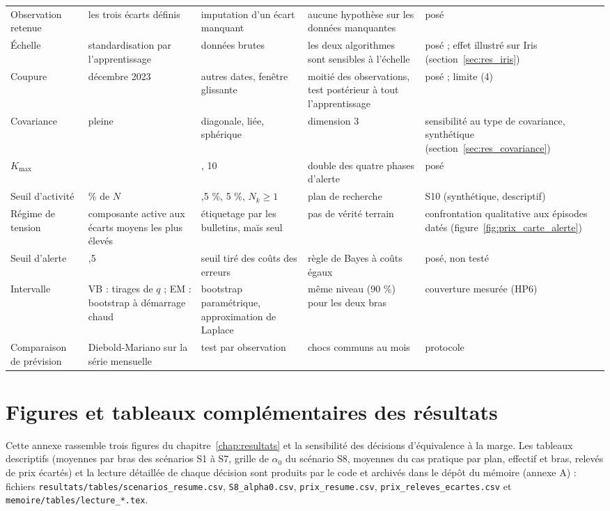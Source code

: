 {\begin{longtable}{>{\raggedright\arraybackslash}p{1.9cm}>{\raggedright\arraybackslash}p{2.9cm}>{\raggedright\arraybackslash}p{2.9cm}>{\raggedright\arraybackslash}p{3.9cm}>{\raggedright\arraybackslash}p{3.0cm}}
Observation retenue & les trois écarts définis & imputation d'un écart manquant & aucune hypothèse sur les données manquantes & posé \\
Échelle & standardisation par l'apprentissage & données brutes & les deux algorithmes sont sensibles à l'échelle & posé ; effet illustré sur Iris (section~\ref{sec:res_iris}) \\
Coupure & décembre 2023 & autres dates, fenêtre glissante & moitié des observations, test postérieur à tout l'apprentissage & posé ; limite (4) \\
Covariance & pleine & diagonale, liée, sphérique & dimension 3 & sensibilité au type de covariance, synthétique (section~\ref{sec:res_covariance}) \\
$K_{\max}$ & 8 & 6, 10 & double des quatre phases d'alerte & posé \\
Seuil d'activité & 1 \% de $N$ & 0,5 \%, 5 \%, $N_k \geq 1$ & plan de recherche & S10 (synthétique, descriptif) \\
Régime de tension & composante active aux écarts moyens les plus élevés & étiquetage par les bulletins, maïs seul & pas de vérité terrain & confrontation qualitative aux épisodes datés (figure~\ref{fig:prix_carte_alerte}) \\
Seuil d'alerte & 0,5 & seuil tiré des coûts des erreurs & règle de Bayes à coûts égaux & posé, non testé \\
Intervalle & VB : tirages de $q$ ; EM : bootstrap à démarrage chaud & bootstrap paramétrique, approximation de Laplace & même niveau (90 \%) pour les deux bras & couverture mesurée (HP6) \\
Comparaison de prévision & Diebold-Mariano sur la série mensuelle & test par observation & chocs communs au mois & protocole \\
\end{longtable}
}

\chapter{Figures et tableaux complémentaires des résultats}
Cette annexe rassemble trois figures du chapitre~\ref{chap:resultats} et la sensibilité des décisions d'équivalence à la marge. Les tableaux descriptifs (moyennes par bras des scénarios S1 à S7, grille de $\alpha_0$ du scénario S8, moyennes du cas pratique par plan, effectif et bras, relevés de prix écartés) et la lecture détaillée de chaque décision sont produits par le code et archivés dans le dépôt du mémoire (annexe A) : fichiers \texttt{resultats/tables/scenarios\_resume.csv}, \texttt{S8\_alpha0.csv}, \texttt{prix\_resume.csv}, \texttt{prix\_releves\_ecartes.csv} et \texttt{memoire/tables/lecture\_*.tex}.

